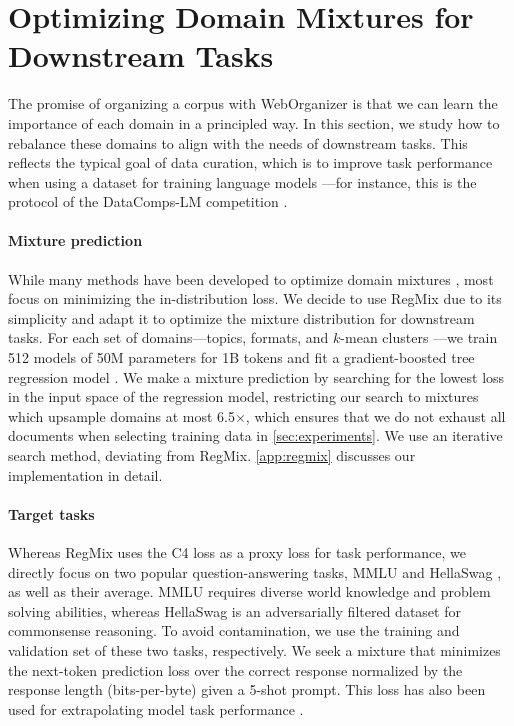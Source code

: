 \section{Optimizing Domain Mixtures for Downstream Tasks} \label{sec:regmix}




The promise of organizing a corpus with WebOrganizer is that we can learn the importance of each domain in a principled way.
In this section, we study how to rebalance these domains to align with the needs of  downstream tasks.
This reflects the typical goal of data curation, which is to improve task performance when using a dataset for training language models \citep{wettig2024qurating, penedo2024finewebdatasetsdecantingweb}---for instance, this is the protocol of the DataComps-LM competition \citep{li2024datacomplm}.

\paragraph{Mixture prediction}
While many methods have been developed to optimize domain mixtures
\citep{xie2023doremi, chen2023skillit, albalak2023efficient, fan2023doge, chen2024aioli, jiang2024adaptive}, most focus on minimizing the in-distribution loss.
We decide to use RegMix \citep{liu2024regmix} due to its simplicity and adapt it to optimize the mixture distribution for downstream tasks.
For each set of domains---topics, formats, and $k$-mean clusters%
---we train 512 models of 50M parameters for 1B tokens and fit a gradient-boosted tree regression model \citep{guolin2017light}.
We make a mixture prediction by searching for the lowest loss in the input space of the regression model, restricting our search to mixtures which upsample domains at most 6.5$\times$, which ensures that we do not exhaust all documents when selecting training data in \autoref{sec:experiments}.
We use an iterative search method, deviating from RegMix. \autoref{app:regmix} discusses our implementation in detail.


\paragraph{Target tasks}
Whereas RegMix \citep{liu2024regmix} uses the C4 loss as a proxy loss for task performance, 
we directly focus on two popular question-answering tasks, MMLU \citep{hendrycks2021measuring} and HellaSwag \citep{zellers2019hellaswag}, as well as their average. 
MMLU requires diverse world knowledge and problem solving abilities, whereas HellaSwag is an adversarially filtered dataset for commonsense reasoning.
To avoid contamination, we use the training and validation set of these two tasks, respectively.
We seek a mixture that minimizes the next-token prediction loss over the correct response normalized by the response length (bits-per-byte) given a 5-shot prompt. This loss has also been used for extrapolating model task performance \citep{bhagia2024establishing}.

